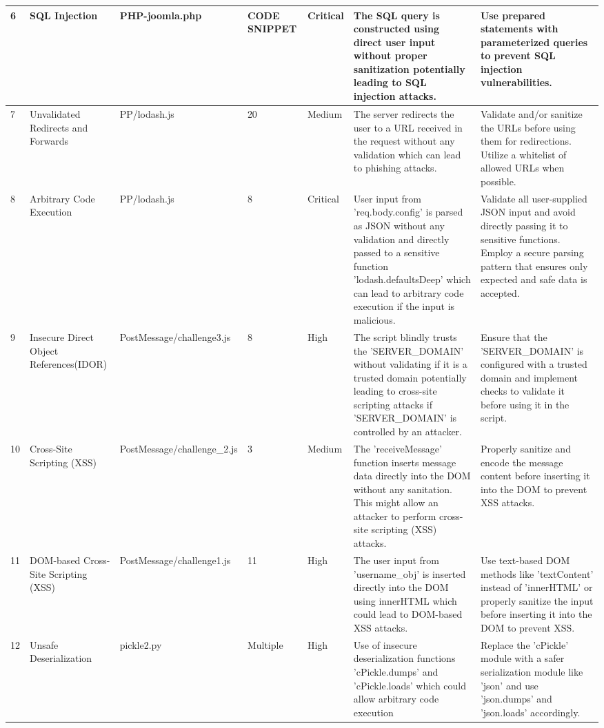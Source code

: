 \begin{landscape}
\begin{table}[!htbp]
{\begin{tabular}{|l|p{4cm}|p{3cm}|p{2cm}|p{1.5cm}|p{12cm}|p{9cm}|}
      6 & SQL Injection & PHP-joomla.php & CODE SNIPPET & Critical & The SQL query is constructed using direct user input without proper sanitization potentially leading to SQL injection attacks. & Use prepared statements with parameterized queries to prevent SQL injection vulnerabilities.  \\ \hline
      7 & Unvalidated Redirects and Forwards & PP/lodash.js & 20 & Medium & The server redirects the user to a URL received in the request without any validation which can lead to phishing attacks. & Validate and/or sanitize the URLs before using them for redirections. Utilize a whitelist of allowed URLs when possible. \\ \hline
      8 & Arbitrary Code Execution & PP/lodash.js & 8 & Critical & User input from 'req.body.config' is parsed as JSON without any validation and directly passed to a sensitive function 'lodash.defaultsDeep' which can lead to arbitrary code execution if the input is malicious. & Validate all user-supplied JSON input and avoid directly passing it to sensitive functions. Employ a secure parsing pattern that ensures only expected and safe data is accepted. \\ \hline
      9 & Insecure Direct Object References(IDOR) & PostMessage/challenge3.js & 8 & High & The script blindly trusts the 'SERVER\_DOMAIN' without validating if it is a trusted domain potentially leading to cross-site scripting attacks if 'SERVER\_DOMAIN' is controlled by an attacker. & Ensure that the 'SERVER\_DOMAIN' is configured with a trusted domain and implement checks to validate it before using it in the script. \\ \hline
      10 & Cross-Site Scripting (XSS) & PostMessage/challenge\_2.js & 3 & Medium & The 'receiveMessage' function inserts message data directly into the DOM without any sanitation. This might allow an attacker to perform cross-site scripting (XSS) attacks. & Properly sanitize and encode the message content before inserting it into the DOM to prevent XSS attacks. \\ \hline
      11 & DOM-based Cross-Site Scripting (XSS) & PostMessage/challenge1.js & 11 & High & The user input from 'username\_obj' is inserted directly into the DOM using innerHTML which could lead to DOM-based XSS attacks. & Use text-based DOM methods like 'textContent' instead of 'innerHTML' or properly sanitize the input before inserting it into the DOM to prevent XSS. \\ \hline
      12 & Unsafe Deserialization & pickle2.py & Multiple & High & Use of insecure deserialization functions 'cPickle.dumps' and 'cPickle.loads' which could allow arbitrary code execution & Replace the 'cPickle' module with a safer serialization module like 'json' and use 'json.dumps' and 'json.loads' accordingly. \\ \hline

\end{tabular}}
\end{table}
\end{landscape}
